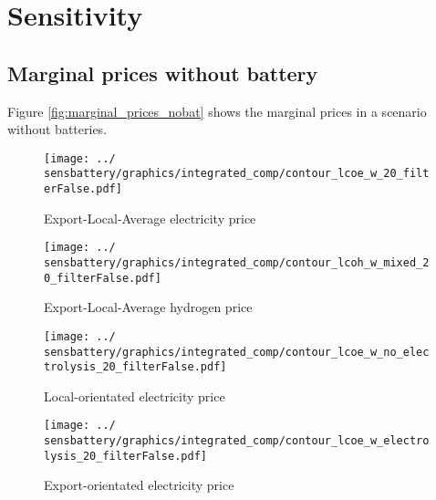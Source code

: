 
\section{Sensitivity}

\subsection{Marginal prices without battery}
Figure \ref{fig:marginal_prices_nobat} shows the marginal prices in a scenario without batteries.

\begin{figure*}[h] %
    \centering
    \begin{subfigure}[b]{0.45\linewidth}
        \centering
        \texttt{[image: ../\\sensbattery/graphics/integrated\_comp/contour\_lcoe\_w\_20\_filterFalse.pdf]}
        \caption{Export-Local-Average electricity price}
        \label{fig:export_local_el_price}
    \end{subfigure}
    \hfill
    \begin{subfigure}[b]{0.45\linewidth}
        \centering
        \texttt{[image: ../\\sensbattery/graphics/integrated\_comp/contour\_lcoh\_w\_mixed\_20\_filterFalse.pdf]}
        \caption{Export-Local-Average hydrogen price}
        \label{fig:export_local_hy_price}
    \end{subfigure}
    \hfill
    \begin{subfigure}[b]{0.45\linewidth}
        \centering
        \texttt{[image: ../\\sensbattery/graphics/integrated\_comp/contour\_lcoe\_w\_no\_electrolysis\_20\_filterFalse.pdf]}
        \caption{Local-orientated electricity price}
        \label{fig:local_el_price_appendix_battery}
    \end{subfigure}
    \hfill
    \begin{subfigure}[b]{0.45\linewidth}
        \centering
        \texttt{[image: ../\\sensbattery/graphics/integrated\_comp/contour\_lcoe\_w\_electrolysis\_20\_filterFalse.pdf]}
        \caption{Export-orientated electricity price}
        \label{fig:export_el_price}
    \end{subfigure}
    \hfill

    \caption{Scenario: No batteries. Marginal prices of electricity and hydrogen subject to export volumes and emission limits depending on various weightings. Black lines indicate the lowest price at each emission limit.}
    \label{fig:marginal_prices_nobat}
\end{figure*}


